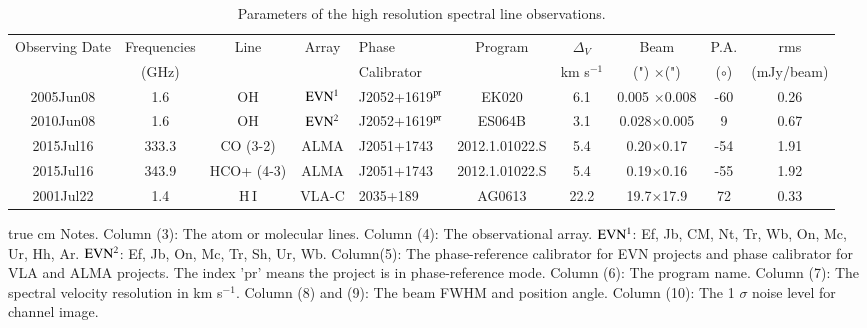 \documentclass[]{aa} %
\newcommand{\kms}{km s$^{-1}$\xspace}
\newcommand{\HI}{{\rm H\,{\scriptsize I}}\xspace}
\begin{document}
   \setlength{\tabcolsep}{0.05in}
  \begin{table*}
       \caption{Parameters of the high resolution spectral line observations. }
     \label{vlbilist}
  \centering
  \begin{tabular}{c c c c l c c c c c }     %
  \hline\hline
   Observing Date & Frequencies & Line& Array                                             & Phase       & Program    & $\Delta_V$    & Beam  &  P.A.   & rms \\
                  &    (GHz)  &  &                                      & Calibrator  &            &  \kms        & (") $\times$(")   &  ($\circ$) & (mJy/beam)   \\
   \hline
     2005Jun08    &  1.6    &  OH  & $\rm EVN^{1}$   & J2052+1619$\rm ^{pr}$  & EK020      & 6.1               & 0.005 $\times$0.008 & -60 &0.26\\
     2010Jun08    &  1.6    &  OH  & $\rm EVN^{2}$               & J2052+1619$\rm ^{pr}$  & ES064B     & 3.1               & 0.028$\times$0.005 & 9  &0.67 \\

     2015Jul16    &  333.3 & CO (3-2)  & ALMA  & J2051+1743 & 2012.1.01022.S  &  5.4      & 0.20$\times$0.17  &-54& 1.91    \\
     2015Jul16    & 343.9 &HCO+ (4-3) & ALMA  & J2051+1743 & 2012.1.01022.S  &  5.4      & 0.19$\times$0.16  &-55 & 1.92   \\
     2001Jul22    &  1.4   & \HI      & VLA-C                     & 2035+189& AG0613 & 22.2          & 19.7$\times$17.9  &72& 0.33 \\
   \hline
   \end{tabular}
    true cm \noindent Notes. Column (3): The atom or molecular lines. Column (4): The observational array. $\rm EVN^{1}$: Ef, Jb, CM, Nt, Tr, Wb, On, Mc, Ur, Hh, Ar.  $\rm EVN^{2}$: Ef, Jb, On, Mc, Tr, Sh, Ur, Wb. Column(5): The phase-reference calibrator for EVN projects and phase calibrator for VLA and ALMA projects. The index 'pr' means the project is in phase-reference mode. Column (6): The program name. Column (7): The spectral velocity resolution in \kms. Column (8) and (9): The beam FWHM and position angle. Column (10): The 1 $\sigma$ noise level for channel image.
   \end{table*}
\end{document}

